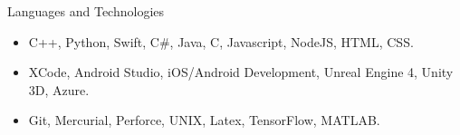 \documentclass[]{mcdowellcv}
\begin{document}
	\begin{cvsection}{Languages and Technologies}
		\begin{cvsubsection}{}{}{}	
			\begin{itemize}
				\item C++, Python, Swift, C\#, Java, C, Javascript, NodeJS, HTML, CSS.
				\item XCode, Android Studio, iOS/Android Development, Unreal Engine 4, Unity 3D, Azure.
				\item Git, Mercurial, Perforce, UNIX, Latex, TensorFlow, MATLAB.
			\end{itemize}
		\end{cvsubsection}
	\end{cvsection}
	
\end{document}
